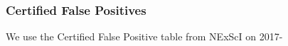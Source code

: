 \subsubsection{Certified False Positives}
We use the Certified False Positive table from NExScI on 2017-


